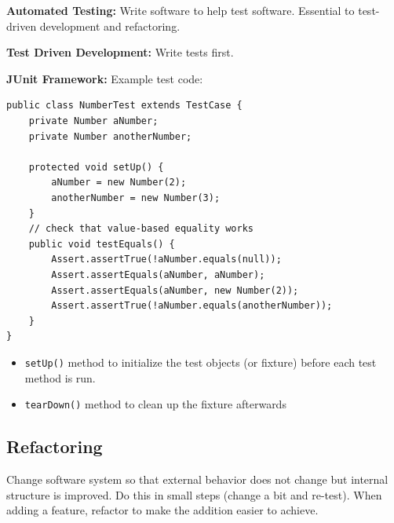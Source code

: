\documentclass[8pt, letterpaper, titlepage]{article}
\begin{document}
\begin{multicols*}{2}
\textbf{Automated Testing:} Write software to help test software. Essential to test-driven development and refactoring.

\textbf{Test Driven Development:} Write tests first.

\textbf{JUnit Framework:}
Example test code:
\begin{lstlisting}[basicstyle=\footnotesize\ttfamily]
public class NumberTest extends TestCase {
    private Number aNumber;
    private Number anotherNumber;
    
    protected void setUp() {
        aNumber = new Number(2);
        anotherNumber = new Number(3);
    }
    // check that value-based equality works
    public void testEquals() {
        Assert.assertTrue(!aNumber.equals(null));
        Assert.assertEquals(aNumber, aNumber);
        Assert.assertEquals(aNumber, new Number(2));
        Assert.assertTrue(!aNumber.equals(anotherNumber));
    }
}
\end{lstlisting}
\begin{itemize}
    \item \lstinline{setUp()} method to initialize the test objects (or fixture) before each test method is run.
    \item \lstinline{tearDown()} method to clean up the fixture afterwards
\end{itemize}

\subsection*{Refactoring}

Change software system so that external behavior does not change but internal structure is improved. Do this in small steps (change a bit and re-test). When adding a feature, refactor to make the addition easier to achieve. 


\end{multicols*}
\end{document}

